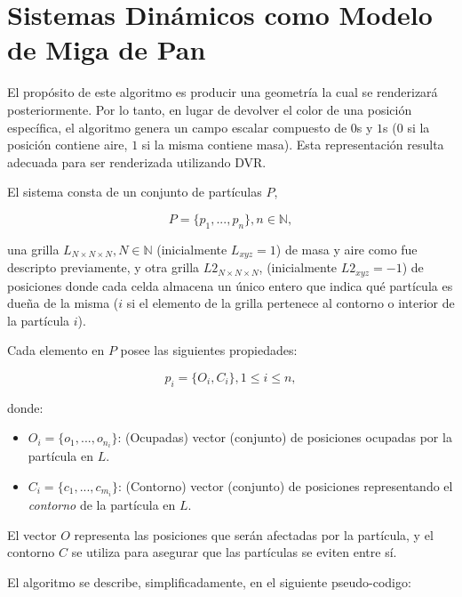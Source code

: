 \documentclass[spanish,a4paper,11pt,oneside,links]{report}
\begin{document}
\section{Sistemas Dinámicos como Modelo de Miga de Pan}
El prop\'osito de este algoritmo es producir una geometr\'ia la cual se renderizar\'a posteriormente. Por lo tanto, en lugar de devolver el color de una posici\'on espec\'ifica, el algoritmo genera un campo escalar compuesto de $0$s y $1$s ($0$ si la posici\'on contiene aire, $1$ si la misma contiene masa).
Esta representaci\'on resulta adecuada para ser renderizada utilizando DVR.

El sistema consta de un conjunto de part\'iculas $P$,

\begin{equation}
  P = \{p_{1}, ... , p_{n}\}, n  \in \mathbb{N},
\end{equation}

\noindent una grilla $L_{N\times N \times N}, N \in \mathbb{N} $ (inicialmente $L_{xyz}=1$) de masa y aire como fue descripto previamente, y otra grilla $L2_{N\times N \times N}$, (inicialmente $L2_{xyz}=-1$) de posiciones donde cada celda almacena un único entero que indica qu\'e part\'icula es due\~na de la misma ($i$ si el elemento de la grilla pertenece al contorno o interior de la part\'icula $i$).

Cada elemento en $P$ posee las siguientes propiedades:

\begin{equation}
  p_{i} = \{O_{i}, C_{i}\}, 1 \le i \le n,
\end{equation}

\noindent donde:

\begin{itemize}
\item $O_{i} = \{o_{1}, ... , o_{n_{i}}\}$: (Ocupadas) vector (conjunto) de posiciones ocupadas por la part\'icula en $L$.

\item $C_{i} = \{c_{1}, ... , c_{m_{i}}\}$: (Contorno) vector (conjunto) de posiciones representando el {\em contorno} de la part\'icula en $L$.
\end{itemize}

El vector $O$ representa las posiciones que ser\'an afectadas por la part\'icula, y el contorno $C$ se utiliza para asegurar que las part\'iculas se eviten entre s\'i.

El algoritmo se describe, simplificadamente, en el siguiente pseudo-codigo: 
\end{document}
